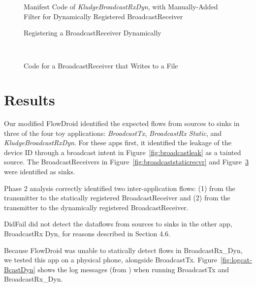 \begin{figure}[!h]
\begin{framed}

\caption{Manifest Code of \emph{KludgeBroadcastRxDyn}, with Manually-Added Filter for Dynamically Registered BroadcastReceiver}
\label{fig:broadcastDynManifestKludge}
\end{framed}
\end{figure}

\begin{figure}[!h]
\begin{framed}

\caption{Registering a BroadcastReceiver Dynamically}
\label{fig:broadcastregister}
\end{framed}
\end{figure}

\
\begin{figure}[!h]
\begin{framed}

\caption{Code for a BroadcastReceiver that Writes to a File}
\label{fig:broadcastdynrecvr}
\end{framed}
\end{figure}

\section{Results}

Our modified FlowDroid identified the expected flows from sources to sinks in three of the four toy applications: \textit{BroadcastTx}, \textit{BroadcastRx Static}, and \textit{KludgeBroadcastRxDyn}. For these apps first, it identified the leakage of the device ID through a broadcast intent in Figure~\ref{fig:broadcastleak} as a tainted source. The BroadcastReceivers in Figure~\ref{fig:broadcaststaticrecvr} and Figure~\ref{fig:broadcastdynrecvr} were identified as sinks.

Phase 2 analysis correctly identified two inter-application flows: (1) from the transmitter to the statically registered BroadcastReceiver and (2) from the transmitter to the dynamically registered BroadcastReceiver.

DidFail did not detect the dataflows from sources to sinks in the other app, BroadcastRx Dyn, for reasons described in Section 4.6.

Because FlowDroid was unable to statically detect flows in BroadcastRx\_Dyn, we tested this app on a physical phone, alongside BroadcastTx. Figure~\ref{fig:logcat-BcastDyn} shows the log messages (from ) when running BroadcastTx and BroadcastRx\_Dyn.

